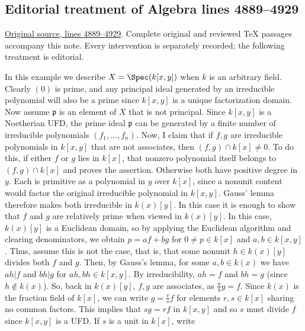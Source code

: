 \subsection{Editorial treatment of Algebra lines 4889--4929}

\hypertarget{algebra-context-026}{}

\noindent\href{https://github.com/stacks/stacks-project/blob/a04446e57ec1fbc252a871afcec7752fb2807b14/algebra.tex\#L4889}{Original source, lines 4889--4929}. Complete original and reviewed TeX passages accompany this note. Every intervention is separately recorded; the following treatment is editorial.


\begin{example}
\label{editorial-source-example-spec-kxy}
In this example we describe $X = \Spec(k[x, y])$
when $k$ is an arbitrary field.
Clearly $(0)$ is prime, and any principal ideal generated by an
irreducible polynomial will also be a prime since $k[x, y]$ is a
unique factorization domain. Now assume $\mathfrak p$ is an
element of $X$ that is not principal. Since $k[x, y]$ is a
Noetherian UFD, the prime ideal $\mathfrak p$ can be generated
by a finite number of irreducible polynomials $(f_1, \ldots, f_n)$.
Now, I claim that if $f, g$ are irreducible polynomials in $k[x, y]$
that are not associates, then $(f, g) \cap k[x] \neq 0$. To do this,
if either $f$ or $g$ lies in $k[x]$, that nonzero polynomial
itself belongs to $(f,g)\cap k[x]$ and proves the assertion.
Otherwise both have positive degree in $y$. Each is primitive as
a polynomial in $y$ over $k[x]$, since a nonunit content would
factor the original irreducible polynomial in $k[x,y]$.
Gauss' lemma therefore makes both irreducible in $k(x)[y]$.
In this case it is enough to show that $f$ and $g$ are relatively prime when
viewed in $k(x)[y]$. In this case, $k(x)[y]$ is a Euclidean domain,
so by applying the Euclidean algorithm and clearing denominators, we
obtain $p = af + bg$ for $0 \ne p \in k[x]$ and $a, b \in k[x, y]$. Thus, assume this is not
the case, that is, that some nonunit $h \in k(x)[y]$ divides both
$f$ and $g$. Then, by Gauss's lemma, for some $a, b \in k(x)$ we
have $ah | f$ and $bh | g$ for $ah, bh \in k[x, y]$. By
irreducibility, $ah = f$ and
$bh = g$ (since $h \notin k(x)$). So, back in $k(x)[y]$, $f, g $
are associates, as $\frac{a}{b} g = f$. Since
$k(x)$ is the fraction field of $k[x]$, we can write $g = \frac{r}{s} f $
for elements $r , s \in k[x]$ sharing no common factors. This
implies that $sg = rf$ in $k[x, y]$ and so $s$ must divide $f$
since $k[x,y]$ is a UFD. If $s$ is a unit in $k[x]$, write

\end{example}
